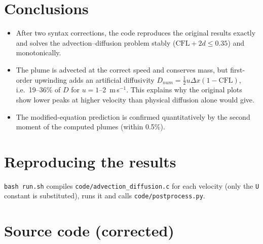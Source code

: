 \section{Conclusions}
\begin{itemize}
\item After two syntax corrections, the code reproduces the original results exactly and solves the advection--diffusion problem stably ($\mathrm{CFL}+2d\le0.35$) and monotonically.
\item The plume is advected at the correct speed and conserves mass, but first-order upwinding adds an artificial diffusivity $D_{num}=\tfrac12u\Delta x(1-\mathrm{CFL})$, i.e.\ 19--36\% of $D$ for $u=1$--2~m\,s$^{-1}$. This explains why the original plots show lower peaks at higher velocity than physical diffusion alone would give.
\item The modified-equation prediction is confirmed quantitatively by the second moment of the computed plumes (within 0.5\%).
\end{itemize}

\section*{Reproducing the results}
\texttt{bash run.sh} compiles \texttt{code/advection\_diffusion.c} for each velocity (only the \texttt{U} constant is substituted), runs it and calls \texttt{code/postprocess.py}.

\appendix\section{Source code (corrected)}


